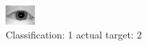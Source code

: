 \begin{figure}[h!]
\begin{center}
\includegraphics[width=0.60\columnwidth]{figures/ID998_class_1_target_2.png}
\end{center}
\caption{ Classification: 1 actual target: 2}
\label{fig:ID998_class_1_target_2}
\end{figure}

